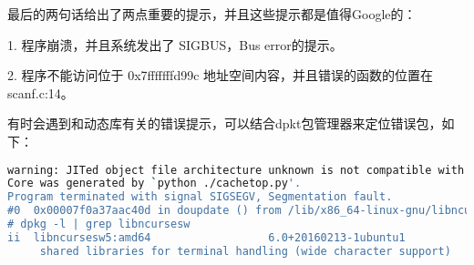 \documentclass[12pt]{article}  %
\begin{document}
最后的两句话给出了两点重要的提示，并且这些提示都是值得Google的：\par
1. 程序崩溃，并且系统发出了 SIGBUS，Bus error的提示。\par
2. 程序不能访问位于 0x7fffffffd99c 地址空间内容，并且错误的函数的位置在 scanf.c:14。\par
有时会遇到和动态库有关的错误提示，可以结合dpkt包管理器来定位错误包，如下：
\begin{lstlisting}[language=sh]
warning: JITed object file architecture unknown is not compatible with target architecture i386:x86-64.
Core was generated by `python ./cachetop.py'.
Program terminated with signal SIGSEGV, Segmentation fault.
#0  0x00007f0a37aac40d in doupdate () from /lib/x86_64-linux-gnu/libncursesw.so.5
# dpkg -l | grep libncursesw
ii  libncursesw5:amd64                  6.0+20160213-1ubuntu1                    amd64
     shared libraries for terminal handling (wide character support)
\end{lstlisting}
\end{document}

